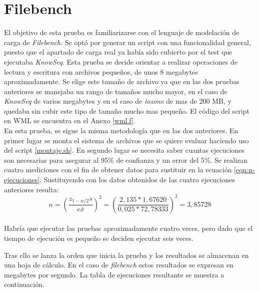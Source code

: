 \section{Filebench}
El objetivo de esta prueba es familiarizarse con el lenguaje de modelación de carga de \textit{Filebench}. Se optó por generar un script con una funcionalidad general, puesto que el apartado de carga real ya había sido cubierto por el test que ejecutaba \textit{KnowSeq}. Esta prueba se decide orientar a realizar operaciones de lectura y escritura con archivos pequeños, de unos 8 megabytes aproximadamente. Se elige este tamaño de archivo ya que en las dos pruebas anteriores se manejaba un rango de tamaños mucho mayor, en el caso de \textit{KnowSeq} de varios megabytes y en el caso de \textit{iozone} de mas de 200 MB, y quedaba sin cubir este tipo de tamaño mucho mas pequeño. El código del script en WML se encuentra en el Anexo \ref{wml.f}.\\

En esta prueba, se sigue la misma metodología que en las dos anteriores. En primer lugar se monta el sistema de archivos que se quiere evaluar haciendo uso del script \ref{montaje.sh}. En segundo lugar se necesita saber cuantas ejecuciones son necesarias para asegurar al 95\% de confianza y un error del 5\%. Se realizan cuatro mediciones con el fin de obtener datos para sustituir en la ecuación \ref{eqn:n-ejecuciones}. Sustituyendo con los datos obtenidos de las cuatro ejecuciones anteriores resulta: $$
n=\left(\frac{z_{1-\alpha / 2} s}{e \bar{x}}\right)^{2} = \left(\frac{2,135*1,67620}{0,025*72,78333}\right)^{2} = 3,85728
$$\\

Habría que ejecutar las pruebas aproximadamente cuatro veces, pero dado que el tiempo de ejecución es pequeño se deciden ejecutar seis veces.

 Tras ello se lanza la orden que inicia la prueba y los resultados se almacenan en una hoja de cálculo. En el caso de \textit{filebench} estos resultados se expresan en megabytes por segundo. La tabla de ejecuciones resultante se muestra a continuación.
 
